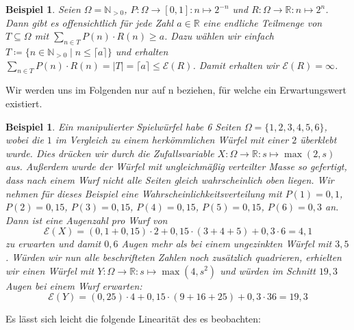 \documentclass[a4paper]{article}
\newtheorem{beispiel}[satz]{Beispiel}
\theoremstyle{nonumberplain}
\begin{document}
	\begin{beispiel}
		Seien $\Omega = \mathbb{N}_{>0}$, $P : \Omega \to [0,1] : n \mapsto 2^{-n}$ und $R : \Omega \to \mathbb{R} : n \mapsto 2^{n}$. Dann gibt es offensichtlich für jede Zahl $a \in \mathbb{R}$ eine endliche Teilmenge von $T \subseteq \Omega$ mit $\sum_{n \in T}{P(n) \cdot R(n)} \geq a$. Dazu wählen wir einfach $T \coloneqq \{n \in \mathbb{N}_{>0}\mid n \leq \lceil a \rceil \}$ und erhalten $\sum_{n \in T}{P(n) \cdot R(n)} = |T| = \lceil a \rceil \leq \mathcal{E}(R)$. Damit erhalten wir $\mathcal{E}(R) = \infty$.
	\end{beispiel}
	Wir werden uns im Folgenden nur auf \rvar n beziehen, für welche ein Erwartungswert existiert.
	\begin{beispiel}\label{example-expect}
		Ein manipulierter Spielwürfel habe 6 Seiten $\Omega = \{1,2,3,4,5,6\}$, wobei die $1$ im Vergleich zu einem herkömmlichen Würfel mit einer $2$ überklebt wurde. Dies drücken wir durch die Zufallsvariable $X : \Omega \to \mathbb{R} : s \mapsto \max(2,s)$ aus. Außerdem wurde der Würfel mit ungleichmäßig verteilter Masse so gefertigt, dass nach einem Wurf nicht alle Seiten gleich wahrscheinlich oben liegen. Wir nehmen für dieses Beispiel eine Wahrscheinlichkeitsverteilung mit $P(1)=0,1$, $P(2)=0,15$, $P(3)=0,15$, $P(4)=0,15$, $P(5)=0,15$, $P(6)=0,3$ an.
		Dann ist eine Augenzahl pro Wurf von
		\[
		\mathcal{E}(X) = (0,1 + 0,15) \cdot 2 + 0,15 \cdot (3 + 4 + 5) + 0,3 \cdot 6 = 4,1
		\]
		zu erwarten und damit $0,6$ Augen mehr als bei einem ungezinkten Würfel mit \expect{} $3,5$. Würden wir nun alle beschrifteten Zahlen noch zusätzlich quadrieren, erhielten wir einen Würfel mit $Y : \Omega \to \mathbb{R} : s \mapsto \max(4, s^2)$ und würden im Schnitt $19,3$ Augen bei einem Wurf erwarten:
		\[
		\mathcal{E}(Y) = (0,25) \cdot 4 + 0,15 \cdot (9 + 16 + 25) + 0,3 \cdot 36 = 19,3
		\]
	\end{beispiel}
	
	Es lässt sich leicht die folgende Linearität des \expect{}es beobachten:
	
\end{document}
